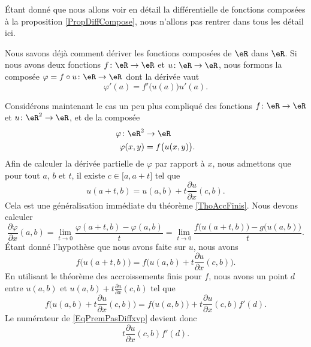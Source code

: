 Étant donné que nous allons voir en détail la différentielle de fonctions composées à la proposition \ref{PropDiffCompose}, nous n'allons pas rentrer dans tous les détail ici.

Nous savons déjà comment dériver les fonctions composées de $\eR$ dans $\eR$. Si nous avons deux fonctions $f\colon \eR\to \eR$ et $u\colon \eR\to \eR$, nous formons la composée $\varphi=f\circ u\colon \eR\to \eR$ dont la dérivée vaut
\begin{equation}
	\varphi'(a)=f'\big( u(a) \big)u'(a).
\end{equation}

Considérons maintenant le cas un peu plus compliqué des fonctions $f\colon \eR\to \eR$ et $u\colon \eR^2\to \eR$, et de la composée
\begin{equation}
	\begin{aligned}
		\varphi\colon \eR^2&\to \eR \\
		\varphi(x,y)&= f\big( u(x,y) \big). 
	\end{aligned}
\end{equation}
Afin de calculer la dérivée partielle de $\varphi$ par rapport à $x$, nous admettons que pour tout $a$, $b$ et $t$, il existe $c\in\mathopen[ a , a+t \mathclose]$ tel que
\begin{equation}
	u(a+t,b)=u(a,b)+t\frac{ \partial u }{ \partial x }(c,b).
\end{equation}
Cela est une généralisation immédiate du théorème \ref{ThoAccFinis}. Nous devons calculer
\begin{equation}		\label{EqPremPasDiffxvp}
	\frac{ \partial \varphi }{ \partial x }(a,b)=\lim_{t\to 0} \frac{ \varphi(a+t,b)-\varphi(a,b) }{ t }=\lim_{t\to 0} \frac{ f\big( u(a+t,b) \big)-g\big( u(a,b) \big) }{ t }.
\end{equation}
Étant donné l'hypothèse que nous avons faite sur $u$, nous avons
\begin{equation}
	f\big( u(a+t,b) \big)=f\big( u(a,b)+t\frac{ \partial u }{ \partial x }(c,b) \big).
\end{equation}
En utilisant le théorème des accroissements finis pour $f$, nous avons un point $d$ entre $u(a,b)$ et $u(a,b)+t\frac{ \partial u }{ \partial x }(c,b)$ tel que
\begin{equation}
	f\big( u(a,b)+t\frac{ \partial u }{ \partial x }(c,b) \big)=f\big( u(a,b) \big)+t\frac{ \partial u }{ \partial x }(c,b)f'(d).
\end{equation}
Le numérateur de \eqref{EqPremPasDiffxvp} devient donc
\begin{equation}
	t\frac{ \partial u }{ \partial x }(c,b)f'(d).
\end{equation}
